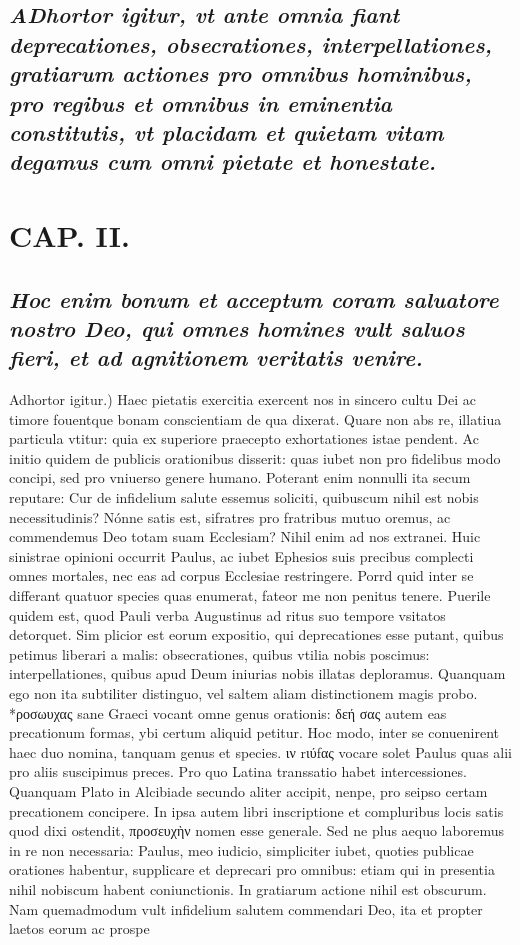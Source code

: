 \documentclass{article}
\begin{document}
\begin{pages}
\subsection*{\textit{\huge\textbf{A}\normalsize Dhortor igitur, vt ante omnia fiant deprecationes, obsecrationes, interpellationes, gratiarum actiones pro omnibus hominibus, pro regibus et omnibus in eminentia constitutis, vt placidam et quietam vitam degamus cum omni pietate et honestate. }}
\section*{CAP. II. }
\marginpar{[ p.17 ]}
{}
\subsection*{\textit{ Hoc enim bonum et acceptum coram saluatore nostro Deo, qui omnes homines vult saluos fieri, et ad agnitionem veritatis venire. }}\pstart Adhortor igitur.) Haec pietatis exercitia exercent nos in sincero cultu Dei ac timore fouentque bonam conscientiam de qua dixerat. Quare non abs re, illatiua particula vtitur: quia ex superiore praecepto exhortationes istae pendent. Ac initio quidem de publicis orationibus disserit: quas iubet non pro fidelibus modo concipi, sed pro vniuerso genere humano. Poterant enim nonnulli ita secum reputare: Cur de infidelium salute essemus soliciti, quibuscum nihil est nobis necessitudinis? Nónne satis est, sifratres pro fratribus mutuo oremus, ac commendemus Deo totam suam Ecclesiam? Nihil enim ad nos extranei. Huic sinistrae opinioni occurrit Paulus, ac iubet Ephesios suis precibus complecti omnes mortales, nec eas ad corpus Ecclesiae restringere. Porrd quid inter se differant quatuor species quas enumerat, fateor me non penitus tenere. Puerile quidem est, quod Pauli verba Augustinus ad ritus suo tempore vsitatos detorquet. Sim plicior est eorum expositio, qui deprecationes esse putant, quibus petimus liberari a malis: obsecrationes, quibus vtilia nobis poscimus: interpellationes, quibus apud Deum iniurias nobis illatas deploramus. Quanquam ego non ita subtiliter distinguo, vel saltem aliam distinctionem magis probo. *ροσωυχας sane Graeci vocant omne genus orationis: δεή σας autem eas precationum formas, ybi certum aliquid petitur. Hoc modo, inter se conuenirent haec duo nomina, tanquam genus et species. ιν rιύfας vocare solet Paulus quas alii pro aliis suscipimus preces. Pro quo Latina transsatio habet intercessiones. Quanquam Plato in Alcibiade secundo aliter accipit, nenpe, pro seipso certam precationem concipere. In ipsa autem libri inscriptione et compluribus locis satis quod dixi ostendit, προσευχὴν nomen esse generale. Sed ne plus aequo laboremus in re non necessaria: Paulus, meo iudicio, simpliciter iubet, quoties publicae orationes habentur, supplicare et deprecari pro omnibus: etiam qui in presentia nihil nobiscum habent coniunctionis. In gratiarum actione nihil est obscurum. Nam quemadmodum vult infidelium salutem commendari Deo, ita et propter laetos eorum ac prospe 
\end{pages}
\end{document}

